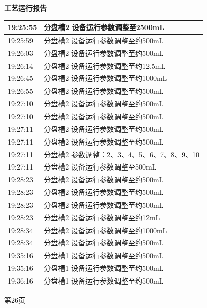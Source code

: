 \documentclass[UTF8,10pt,a4paper,fontset=fandol]{ctexart}
\begin{document}
\begin{minipage}[t]{0.48\linewidth}
\centering
\textbf{工艺运行报告}

\smallskip
\begin{tabular}{|p{1.25cm}|p{5.35cm}|}
\hline
19:25:55 & 分盘槽2 设备运行参数调整至2500mL \\ \hline
19:25:59 & 分盘槽2 设备运行参数调整至约500mL \\ \hline
19:26:03 & 分盘槽2 设备运行参数调整至约500mL \\ \hline
19:26:14 & 分盘槽2 设备运行参数调整至约12.5mL \\ \hline
19:26:45 & 分盘槽2 设备运行参数调整至约1000mL \\ \hline
19:26:55 & 分盘槽2 设备运行参数调整至约500mL \\ \hline
19:27:10 & 分盘槽2 设备运行参数调整至约500mL \\ \hline
19:27:10 & 分盘槽2 设备运行参数调整至约500mL \\ \hline
19:27:11 & 分盘槽2 设备运行参数调整至约500mL \\ \hline
19:27:11 & 分盘槽2 设备运行参数调整至约500mL \\ \hline
19:27:11 & 分盘槽2 参数调整：2、3、4、5、6、7、8、9、10 \\ \hline
19:27:11 & 分盘槽2 设备运行参数调整至500mL \\ \hline
19:28:23 & 分盘槽2 设备运行参数调整至约500mL \\ \hline
19:28:23 & 分盘槽2 设备运行参数调整至约500mL \\ \hline
19:28:23 & 分盘槽2 设备运行参数调整至约500mL \\ \hline
19:28:23 & 分盘槽2 设备运行参数调整至约12mL \\ \hline
19:28:34 & 分盘槽2 设备运行参数调整至约1000mL \\ \hline
19:28:34 & 分盘槽2 设备运行参数调整至约500mL \\ \hline
19:35:16 & 分盘槽1 设备运行参数调整至约500mL \\ \hline
19:35:16 & 分盘槽1 设备运行参数调整至约500mL \\ \hline
19:36:16 & 分盘槽1 设备运行参数调整至约500mL \\ \hline
\end{tabular}

\medskip
第26页
\end{minipage}

\vspace{1em}
\end{document}
